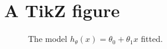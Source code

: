 \section{A TikZ figure}

\begin{figure}[ht]
\centering
{}
\caption{\label{fig:reg} The model $h_{\theta}(x) = \theta_0 + \theta_1 x$ fitted.}
\end{figure}
